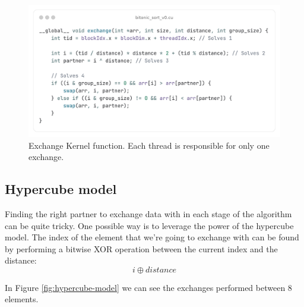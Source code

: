 \documentclass{article}
\begin{document}
\begin{figure}[H]
    \centering
    \includegraphics[width=1\textwidth]{exchange-v0.png}
    \caption{Exchange Kernel function. Each thread is responsible for only one exchange.}
    \label{fig:exchange-kernel}
\end{figure}


\subsection{Hypercube model}

Finding the right partner to exchange data with in each stage of the algorithm can be quite tricky. One possible way
is to leverage the power of the hypercube model. The index of the element that we're going to exchange with can be
found by performing a bitwise XOR operation between the current index and the distance:
$$i \oplus distance$$

In Figure \ref{fig:hypercube-model} we can see the exchanges performed between 8 elements.
\end{document}
